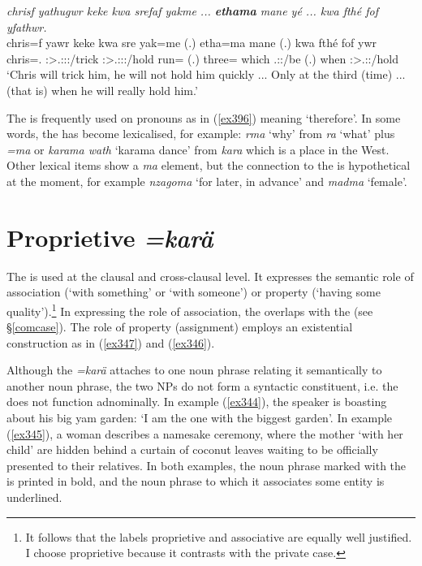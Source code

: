 \begin{exe}
	\ex \emph{chrisf yathugwr keke kwa srefaf yakme ... \textbf{ethama} mane yé ... kwa fthé fof yfathwr.}\\
	\gll chris=f yawr keke kwa sre yak=me (.) etha=ma mane  (.) kwa fthé fof ywr\\
	chris=\Erg.\Sg{} \Stsg:\Sbj>\Tsg.\Masc:\Obj:\Nonpast:\Ipfv/trick \Neg{} \Fut{} \Stsg:\Sbj>\Tsg.\Masc:\Obj:\Irr:\Pfv/hold run=\Ins{} (.) three=\Char{} which \Tsg.\Masc:\Nonpast:\Ipfv/be (.) \Fut{} when \Emph{} \Stsg:\Sbj>\Tsg.\Masc:\Nonpast:\Ipfv/hold\\
	\trans `Chris will trick him, he will not hold him quickly ... Only at the third (time) ... (that is) when he will really hold him.'
	\label{ex402}
\end{exe}

The   is frequently used on  pronouns as in (\ref{ex396}) meaning `therefore'. In some words, the   has become lexicalised, for example: \emph{rma} `why' from \emph{ra} `what' plus \emph{=ma} or \emph{karama wath} `karama dance' from \emph{kara} which is a place in the West. Other lexical items show a \emph{ma} element, but the connection to the   is hypothetical at the moment, for example \emph{nzagoma} `for later, in advance' and \emph{madma} `female'.

\section{Proprietive \emph{=karä}} \label{propcase}

The  is used at the clausal and cross-clausal level. It expresses the semantic role of association (`with something' or `with someone') or property (`having some quality').\footnote{It follows that the labels proprietive and associative are equally well justified. I choose proprietive because it contrasts with the private case.} In expressing the role of association, the  overlaps with the   (see \S{}\ref{comcase}). The role of property (assignment) employs an existential construction as in (\ref{ex347}) and (\ref{ex346}).%

Although the  \emph{=karä} attaches to one noun phrase relating it semantically to another noun phrase, the two NPs do not form a syntactic constituent, i.e. the  does not function adnominally. In example (\ref{ex344}), the speaker is boasting about his big yam garden: `I am the one with the biggest garden'. In example (\ref{ex345}), a woman describes a namesake ceremony, where the mother `with her child' are hidden behind a curtain of coconut leaves waiting to be officially presented to their relatives. In both examples, the noun phrase marked with the  is printed in bold, and the noun phrase to which it associates some entity is underlined.


